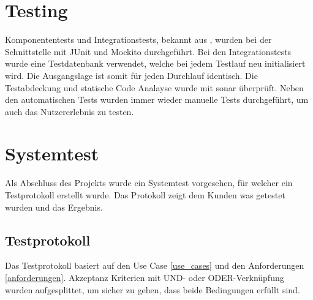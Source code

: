 \section{Testing}
Komponententests und Integrationstests, bekannt aus \cite{test_soft_book}, wurden bei der Schnittstelle mit JUnit und Mockito durchgeführt. Bei den Integrationstests wurde eine 
Testdatenbank verwendet, welche bei jedem Testlauf neu initialisiert wird. Die Ausgangslage ist somit für jeden Durchlauf identisch. Die Testabdeckung und statische Code Analayse wurde 
mit \gls{sonar} überprüft. Neben den automatischen Tests wurden immer wieder manuelle Tests durchgeführt, um auch das Nutzererlebnis zu testen.

\section{Systemtest}
Als Abschluss des Projekts wurde ein Systemtest vorgesehen, für welcher ein Testprotokoll erstellt wurde. Das Protokoll zeigt dem Kunden was getestet wurden und das Ergebnis.

\subsection{Testprotokoll}
Das Testprotokoll basiert auf den Use Case \ref{use_cases} und den Anforderungen \ref{anforderungen}. Akzeptanz Kriterien mit UND- oder ODER-Verknüpfung wurden 
aufgesplittet, um sicher zu gehen, dass beide Bedingungen erfüllt sind.

